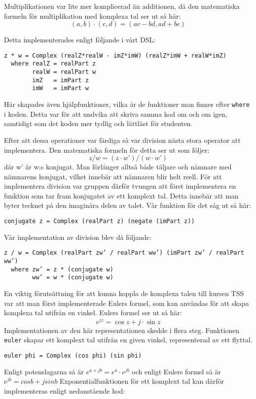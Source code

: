 \documentclass[]{article}
\begin{document}
Multiplikationen var lite mer komplicerad än additionen, då den matematiska formeln för multiplikation med komplexa
tal ser ut så här:
 \[(a, b) \cdot (c, d) = (ac - bd, ad + bc) \] \cite{conway1978functions}

Detta implementerades enligt följande i vårt DSL:
\begin{verbatim}
z * w = Complex (realZ*realW - imZ*imW) (realZ*imW + realW*imZ)
  where realZ = realPart z
        realW = realPart w
        imZ   = imPart z
        imW   = imPart w
\end{verbatim}

Här skapades även hjälpfunktioner, vilka är de funktioner man finner efter \texttt{where}
i koden. Detta var för att undvika att skriva samma kod om och om igen, samtidigt som det koden mer tydlig och
lättläst för studenten.


Efter att dessa operationer var färdiga så var division nästa stora operator att implementera. Den matematiska formeln
för detta ser ut som följer:
\[ z / w = (z \cdot w’) / (w \cdot w’) \]
där w’ är w:s konjugat.
Man förlänger alltså både täljare och nämnare med nämnarens konjugat, vilket innebär att nämnaren
blir helt reell. För att implementera division var gruppen därför tvungen att först implementera en
funktion som tar fram konjugatet av ett komplext tal. Detta innebär att man byter tecknet på den imaginära
delen av talet. Vår funktion för det såg ut så här:

\begin{verbatim}
conjugate z = Complex (realPart z) (negate (imPart z))
\end{verbatim}
Vår implementation av division blev då följande:
\begin{verbatim}
z / w = Complex (realPart zw’ / realPart ww’) (imPart zw’ / realPart ww’)
  where zw’ = z * (conjugate w)
        ww’ = w * (conjugate w)
\end{verbatim}

En viktig förutsättning för att kunna koppla de komplexa talen till kursen TSS var att man först
implementerade Eulers formel, som kan användas för att skapa komplexa tal utifrån en vinkel. Eulers
formel ser ut så här:
\[e^{jz}=\cos z+ j \cdot \sin z \]
Implementationen av den här representationen skedde i flera steg.
Funktionen \texttt{euler} skapar ett komplext tal utifrån en
given vinkel, representerad av ett flyttal.
\begin{verbatim}
euler phi = Complex (cos phi) (sin phi)
\end{verbatim}
Enligt potenslagarna%
så är \(e^{a+jb} = e^{a} \cdot e^{jb}\) och enligt Eulers formel så är
\(e^{j b} = cos b + j\dot sin b\) Exponentialfunktionen för ett komplext tal kan
därför implementeras enligt nedanstående kod:
\end{document}
